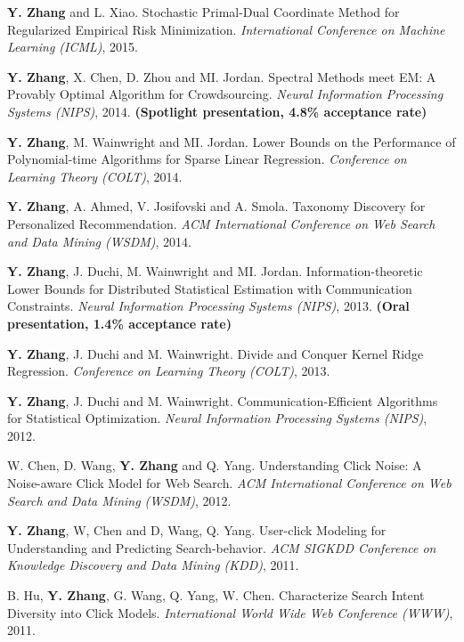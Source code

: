 \documentclass{res}
\begin{document}
\begin{resume}
\begin{enumerate}[label={[C\arabic*]}, ref={C\arabic*}]
\item \textbf{Y. Zhang} and L. Xiao. Stochastic Primal-Dual Coordinate Method for Regularized Empirical Risk Minimization.
\emph{International Conference on Machine Learning (ICML)}, 2015.\label{stochastic-icml15}

\item \textbf{Y. Zhang}, X. Chen, D. Zhou and MI. Jordan. Spectral Methods meet EM: A Provably Optimal Algorithm for Crowdsourcing.
\emph{Neural Information Processing Systems (NIPS)}, 2014. \textbf{(Spotlight presentation, 4.8\% acceptance rate)}
\label{spectral-nips14}

\item \textbf{Y. Zhang}, M. Wainwright and MI. Jordan. Lower Bounds on the Performance of Polynomial-time Algorithms for Sparse Linear Regression. \emph{Conference on Learning Theory (COLT)}, 2014. \label{lower-colt14}

\item \textbf{Y. Zhang}, A. Ahmed, V. Josifovski and A. Smola. Taxonomy Discovery for Personalized Recommendation. \emph{ACM International Conference on Web Search and Data Mining (WSDM)}, 2014. \label{taxonomy-wsdm14}

\item \textbf{Y. Zhang}, J. Duchi, M. Wainwright and MI. Jordan. Information-theoretic Lower Bounds for Distributed Statistical Estimation with Communication Constraints.
\emph{Neural Information Processing Systems (NIPS)}, 2013. \textbf{(Oral presentation, 1.4\% acceptance rate)}
\label{information-nips13}

\item  \textbf{Y. Zhang}, J. Duchi and M. Wainwright. Divide and Conquer Kernel Ridge Regression.
\emph{Conference on Learning Theory (COLT)}, 2013. \label{divide-colt13}

\item  \textbf{Y. Zhang}, J. Duchi and M. Wainwright. Communication-Efficient Algorithms for Statistical Optimization.
\emph{Neural Information Processing Systems (NIPS)}, 2012. \label{communication-nips12}

\item  W. Chen, D. Wang, \textbf{Y. Zhang} and Q. Yang. Understanding Click Noise: A Noise-aware Click Model for Web Search.
\emph{ACM International Conference on Web Search and Data Mining (WSDM)}, 2012. \label{understanding-wsdm12}

\item  \textbf{Y. Zhang}, W, Chen and D, Wang, Q. Yang. User-click Modeling for Understanding and Predicting Search-behavior.
\emph{ACM SIGKDD Conference on Knowledge Discovery and Data Mining (KDD)}, 2011.\label{user-kdd11}
\item B. Hu, \textbf{Y. Zhang}, G. Wang, Q. Yang, W. Chen. Characterize Search Intent Diversity into Click Models.
\emph{International World Wide Web Conference (WWW)}, 2011. \label{characterize-www11}


\end{enumerate}
\end{resume}
\end{document}
